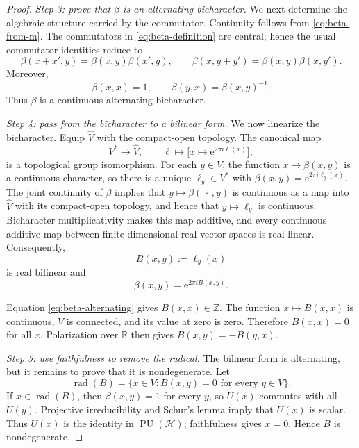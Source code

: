 \documentclass[reqno]{amsart}
\numberwithin{equation}{section}
\theoremstyle{definition}
\theoremstyle{remark}
\newcommand{\cH}{\mathcal H}
\newcommand{\R}{\mathbb R}
\newcommand{\PU}{\operatorname{PU}}
\newcommand{\e}{\mathrm e}
\newcommand{\Step}[1]{\par\medskip\noindent\textit{#1.}\quad}
\begin{document}
\begin{proof}
\Step{Step 3: prove that $\beta$ is an alternating bicharacter}
We next determine the algebraic structure carried by the commutator.
Continuity follows from \eqref{eq:beta-from-m}.  The commutators in
\eqref{eq:beta-definition} are central; hence the usual commutator identities
reduce to
\[
 \beta(x+x',y)=\beta(x,y)\beta(x',y),
 \qquad
 \beta(x,y+y')=\beta(x,y)\beta(x,y').
\]
Moreover,
\begin{equation}\label{eq:beta-alternating}
 \beta(x,x)=1,
 \qquad \beta(y,x)=\beta(x,y)^{-1}.
\end{equation}
Thus $\beta$ is a continuous alternating bicharacter.

\Step{Step 4: pass from the bicharacter to a bilinear form}
We now linearize the bicharacter.  Equip $\widehat V$ with the compact-open
topology.  The canonical map
\[
 V^*\longrightarrow\widehat V,
 \qquad
 \ell\longmapsto\bigl[x\mapsto\e^{2\pi i\ell(x)}\bigr],
\]
is a topological group isomorphism.  For each $y\in V$, the function
$x\mapsto\beta(x,y)$ is a continuous character, so there is a unique
$\ell_y\in V^*$ with $\beta(x,y)=\e^{2\pi i\ell_y(x)}$.  The joint
continuity of $\beta$ implies that $y\mapsto\beta(\,\cdot\,,y)$ is
continuous as a map into $\widehat V$ with its compact-open topology, and
hence that $y\mapsto\ell_y$ is continuous.  Bicharacter
multiplicativity makes this map additive, and every continuous additive map
between finite-dimensional real vector spaces is real-linear.  Consequently,
\begin{equation}\label{eq:B-definition}
 B(x,y):=\ell_y(x)
\end{equation}
is real bilinear and
\begin{equation}\label{eq:beta-B}
 \beta(x,y)=\e^{2\pi iB(x,y)}.
\end{equation}

Equation \eqref{eq:beta-alternating} gives $B(x,x)\in\mathbb Z$.  The
function $x\mapsto B(x,x)$ is continuous, $V$ is connected, and its value at
zero is zero.  Therefore $B(x,x)=0$ for all $x$.  Polarization over $\R$
then gives $B(x,y)=-B(y,x)$.

\Step{Step 5: use faithfulness to remove the radical}
The bilinear form is alternating, but it remains to prove that it is
nondegenerate.  Let
\[
 \operatorname{rad}(B)
 =\{x\in V:B(x,y)=0\text{ for every }y\in V\}.
\]
If $x\in\operatorname{rad}(B)$, then $\beta(x,y)=1$ for every $y$, so
$\widetilde U(x)$ commutes with all $\widetilde U(y)$.  Projective
irreducibility and Schur's lemma imply that $\widetilde U(x)$ is scalar.
Thus $U(x)$ is the identity in $\PU(\cH)$; faithfulness gives $x=0$.
Hence $B$ is nondegenerate.


\end{proof}
\end{document}
